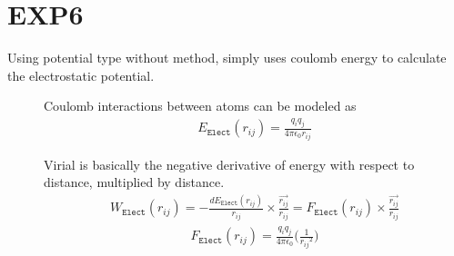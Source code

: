 \documentclass[letterpaper,10pt,english]{sphinxmanual}
\begin{document}
\section{EXP6}
\label{\detokenize{electrostatic:exp6}}
\sphinxAtStartPar
Using  potential type without  method, simply uses coulomb energy to calculate the electrostatic potential.
\begin{description}
\item[{}] \leavevmode
\sphinxAtStartPar
Coulomb interactions between atoms can be modeled as
\begin{equation*}
\begin{split}E_{\texttt{Elect}}(r_{ij}) = \frac{q_i q_j}{4\pi \epsilon_0 r_{ij}}\end{split}
\end{equation*}
\item[{}] \leavevmode
\sphinxAtStartPar
Virial is basically the negative derivative of energy with respect to distance, multiplied by distance.
\begin{equation*}
\begin{split}W_{\texttt{Elect}}(r_{ij}) = -\frac{dE_{\texttt{Elect}}(r_{ij})}{r_{ij}}\times \frac{\overrightarrow{r_{ij}}}{{r_{ij}}} = F_{\texttt{Elect}}(r_{ij}) \times \frac{\overrightarrow{r_{ij}}}{{r_{ij}}}\end{split}
\end{equation*}\begin{equation*}
\begin{split}F_{\texttt{Elect}}(r_{ij}) = \frac{q_i q_j}{4\pi \epsilon_0} \Big( \frac{1}{{r_{ij}}^2} \Big)\end{split}
\end{equation*}
\end{description}
\end{document}

